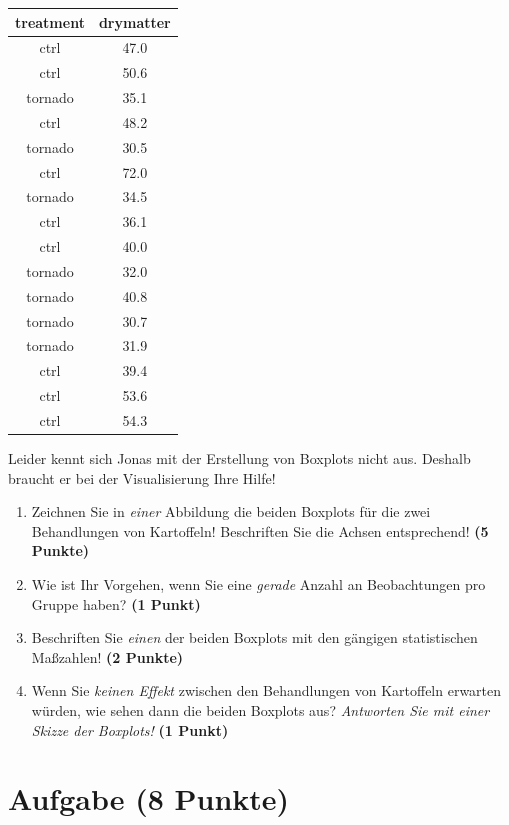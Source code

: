 \documentclass[a4paper, 9pt]{scrartcl}\usepackage[]{graphicx}\usepackage[]{xcolor}
\begin{document}
\begin{table}[!h]
\centering
\begin{tabular}{cc}
\toprule
treatment & drymatter\\
\midrule
ctrl & 47.0\\
ctrl & 50.6\\
tornado & 35.1\\
ctrl & 48.2\\
tornado & 30.5\\
\addlinespace
ctrl & 72.0\\
tornado & 34.5\\
ctrl & 36.1\\
ctrl & 40.0\\
tornado & 32.0\\
\addlinespace
tornado & 40.8\\
tornado & 30.7\\
tornado & 31.9\\
ctrl & 39.4\\
ctrl & 53.6\\
\addlinespace
ctrl & 54.3\\
\bottomrule
\end{tabular}
\end{table}



Leider kennt sich Jonas mit der Erstellung von Boxplots nicht aus. Deshalb braucht er bei der Visualisierung Ihre Hilfe!

\begin{enumerate}
\item Zeichnen Sie in \textit{einer} Abbildung die beiden Boxplots für die zwei Behandlungen von Kartoffeln! Beschriften Sie die Achsen entsprechend! \textbf{(5 Punkte)} 
\item Wie ist Ihr Vorgehen, wenn Sie eine \textit{gerade} Anzahl an
  Beobachtungen pro Gruppe haben? \textbf{(1 Punkt)}
\item Beschriften Sie \textit{einen} der beiden Boxplots mit den gängigen
  statistischen Maßzahlen! \textbf{(2 Punkte)}
\item Wenn Sie \textit{keinen Effekt} zwischen den Behandlungen von
  Kartoffeln erwarten würden, wie sehen dann die beiden Boxplots aus?
  \textit{Antworten Sie mit einer Skizze der Boxplots!}
  \textbf{(1 Punkt)}
\end{enumerate} 
\clearpage

\section{Aufgabe \hfill (8 Punkte)}
\end{document}
